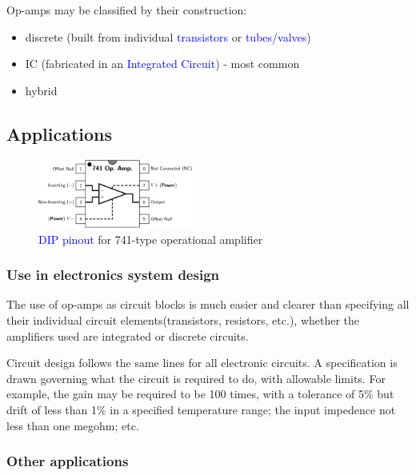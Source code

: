 \documentclass[11pt,a4paper,oneside]{article}
\begin{document}
	Op-amps may be classified by their construction:

	\begin{itemize}
		\item discrete (built from individual \textcolor{blue}{transistors} or \textcolor{blue}{tubes/valves})
		\item IC (fabricated in an \textcolor{blue}{Integrated Circuit}) - most common
		\item hybrid
	\end{itemize}

	\subsection{Applications}

	\begin{figure}
		\centering
		\includegraphics[width=2in]{images/741-type operational amplifier.png}
		\caption{\textcolor{blue}{DIP pinout} for 741-type operational amplifier}
	\end{figure}

	\subsubsection{Use in electronics system design}

	The use of op-amps as circuit blocks is much easier and clearer than specifying all their individual circuit elements(transistors, resistors, etc.), whether the amplifiers used are integrated or discrete circuits.

	Circuit design follows the same lines for all electronic circuits. A specification is drawn governing what the circuit is required to do, with allowable limits. For example, the gain may be required to be 100 times, with a tolerance of 5\% but drift of less than 1\% in a specified temperature range; the input impedence not less than one megohm; etc.

	\subsubsection{Other applications}
\end{document}
